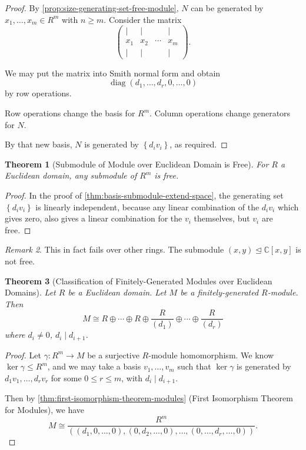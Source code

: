 \documentclass{article}
\newtheorem{theorem}{Theorem}[section]
\theoremstyle{definition}
\theoremstyle{remark}
\newtheorem{remark}[theorem]{Remark}
\newcommand{\pqty}[1]{\left(#1\right)}
\newcommand{\bqty}[1]{\left[#1\right]}
\newcommand{\Bqty}[1]{\left\{#1\right\}}
\newcommand{\flatfrac}[2]{\frac{#1}{#2}}
\newcommand{\functiondomain}[3]{#1:#2\to #3}
\newcommand{\pmqty}[1]{\begin{pmatrix}#1\end{pmatrix}}
\newcommand{\isomorphic}{\cong}
\newcommand{\idealsub}{\trianglelefteq}
\newcommand{\divides}{\mid}
\newcommand{\CC}{\mathbb{C}}
\newcommand{\diag}{\operatorname{diag}}
\begin{document}
\begin{proof}
    By \autoref{prop:size-generating-set-free-module}, \(N\) can be generated by \(x_1, \ldots, x_m \in R^m\) with \(n \geq m\). Consider the matrix
    \[
        \pmqty{
            \vert & \vert &  & \vert \\
            x_1 & x_2 & \cdots & x_m \\
            \vert & \vert &  & \vert
        }.
    \]

    We may put the matrix into Smith normal form and obtain
    \[
        \diag\pqty{d_1, \ldots, d_r, 0, \ldots, 0}
    \]
    by row operations.

    Row operations change the basis for \(R^m\). Column operations change generators for \(N\).

    By that new basis, \(N\) is generated by \(\Bqty{d_i v_i}\), as required.
\end{proof}

\begin{theorem}[Submodule of Module over Euclidean Domain is Free]
    \label{thm:submodule-module-euclidean-domain-free}%
    For \(R\) a Euclidean domain, any submodule of \(R^m\) is free.
\end{theorem}

\begin{proof}
    In the proof of \autoref{thm:basis-submodule-extend-space}, the generating set \(\Bqty{d_i v_i}\) is linearly independent, because any linear combination of the \(d_i v_i\) which gives zero, also gives a linear combination for the \(v_i\) themselves, but \(v_i\) are free.
\end{proof}

\begin{remark}
    This in fact fails over other rings. The submodule \(\pqty{x, y} \idealsub \CC\bqty{x, y}\) is not free.
\end{remark}

\begin{theorem}[Classification of Finitely-Generated Modules over Euclidean Domains]
    \label{thm:classification-finitely-generated-modules-euclidean-domains}%
    Let \(R\) be a Euclidean domain. Let \(M\) be a finitely-generated \(R\)-module. Then
    \[
        M \isomorphic R \oplus \cdots \oplus R \oplus \flatfrac{R}{\pqty{d_1}} \oplus \cdots \oplus \flatfrac{R}{\pqty{d_r}}
    \]
    where \(d_i \neq 0\), \(d_i \divides d_{i + 1}\).
\end{theorem}

\begin{proof}
    Let \(\functiondomain{\gamma}{R^m}{M}\) be a surjective \(R\)-module homomorphism. We know \(\ker \gamma \leq R^m\), and we may take a basis \(v_1, \ldots, v_m\) such that \(\ker \gamma\) is generated by \(d_1 v_1, \ldots, d_r v_r\) for some \(0 \leq r \leq m\), with \(d_i \divides d_{i + 1}\).

    Then by \autoref{thm:first-isomorphism-theorem-modules} (First Isomorphism Theorem for Modules), we have
    \[
        M \isomorphic \flatfrac{R^m}{\pqty{\pqty{d_1, 0, \ldots, 0}, \pqty{0, d_2, \ldots, 0}, \ldots, \pqty{0, \ldots, d_r, \ldots, 0}}}.
    \]
\end{proof}
\end{document}
